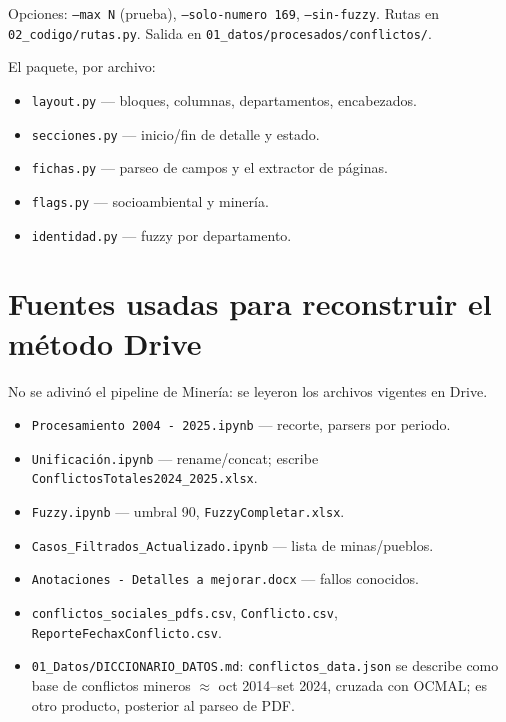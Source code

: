 \documentclass[11pt,a4paper]{article}
\begin{document}
Opciones: \texttt{--max N} (prueba), \texttt{--solo-numero 169}, \texttt{--sin-fuzzy}. Rutas en \texttt{02\_codigo/rutas.py}. Salida en \texttt{01\_datos/procesados/conflictos/}.

El paquete, por archivo:

\begin{itemize}
  \item \texttt{layout.py} --- bloques, columnas, departamentos, encabezados.
  \item \texttt{secciones.py} --- inicio/fin de detalle y estado.
  \item \texttt{fichas.py} --- parseo de campos y el extractor de páginas.
  \item \texttt{flags.py} --- socioambiental y minería.
  \item \texttt{identidad.py} --- fuzzy por departamento.
\end{itemize}

\section{Fuentes usadas para reconstruir el método Drive}

No se adivinó el pipeline de Minería: se leyeron los archivos vigentes en Drive.

\begin{itemize}
  \item \texttt{Procesamiento 2004 - 2025.ipynb} --- recorte, parsers por periodo.
  \item \texttt{Unificación.ipynb} --- rename/concat; escribe \texttt{ConflictosTotales2024\_2025.xlsx}.
  \item \texttt{Fuzzy.ipynb} --- umbral 90, \texttt{FuzzyCompletar.xlsx}.
  \item \texttt{Casos\_Filtrados\_Actualizado.ipynb} --- lista de minas/pueblos.
  \item \texttt{Anotaciones - Detalles a mejorar.docx} --- fallos conocidos.
  \item \texttt{conflictos\_sociales\_pdfs.csv}, \texttt{Conflicto.csv}, \texttt{ReporteFechaxConflicto.csv}.
  \item \texttt{01\_Datos/DICCIONARIO\_DATOS.md}: \texttt{conflictos\_data.json} se describe como base de conflictos mineros $\approx$ oct 2014--set 2024, cruzada con OCMAL; es otro producto, posterior al parseo de PDF.
\end{itemize}
\end{document}
